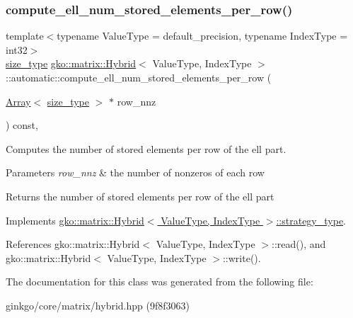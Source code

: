\subsubsection{\texorpdfstring{compute\+\_\+ell\+\_\+num\+\_\+stored\+\_\+elements\+\_\+per\+\_\+row()}{compute\_ell\_num\_stored\_elements\_per\_row()}}
{\footnotesize\ttfamily template$<$typename Value\+Type = default\+\_\+precision, typename Index\+Type = int32$>$ \\
\hyperlink{namespacegko_a6e5c95df0ae4e47aab2f604a22d98ee7}{size\+\_\+type} \hyperlink{classgko_1_1matrix_1_1Hybrid}{gko\+::matrix\+::\+Hybrid}$<$ Value\+Type, Index\+Type $>$\+::automatic\+::compute\+\_\+ell\+\_\+num\+\_\+stored\+\_\+elements\+\_\+per\+\_\+row (\begin{DoxyParamCaption}\item[{\hyperlink{classgko_1_1Array}{Array}$<$ \hyperlink{namespacegko_a6e5c95df0ae4e47aab2f604a22d98ee7}{size\+\_\+type} $>$ $\ast$}]{row\+\_\+nnz }\end{DoxyParamCaption}) const\hspace{0.3cm}{\ttfamily [override]}, {\ttfamily [virtual]}}



Computes the number of stored elements per row of the ell part. 


\begin{DoxyParams}{Parameters}
{\em row\+\_\+nnz} & the number of nonzeros of each row\\
\hline
\end{DoxyParams}
\begin{DoxyReturn}{Returns}
the number of stored elements per row of the ell part 
\end{DoxyReturn}


Implements \hyperlink{classgko_1_1matrix_1_1Hybrid_1_1strategy__type_a0a0cd4024f27c7d0f286f35fc0a6de60}{gko\+::matrix\+::\+Hybrid$<$ Value\+Type, Index\+Type $>$\+::strategy\+\_\+type}.



References gko\+::matrix\+::\+Hybrid$<$ Value\+Type, Index\+Type $>$\+::read(), and gko\+::matrix\+::\+Hybrid$<$ Value\+Type, Index\+Type $>$\+::write().



The documentation for this class was generated from the following file\+:\begin{DoxyCompactItemize}
\item 
ginkgo/core/matrix/hybrid.\+hpp (9f8f3063)\end{DoxyCompactItemize}
